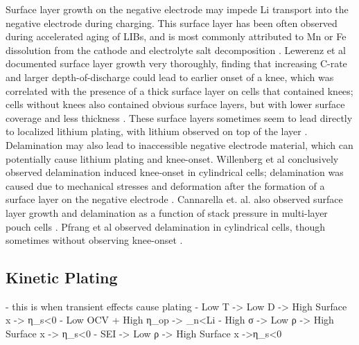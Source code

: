 \documentclass{article}
\begin{document}
Surface layer growth on the negative electrode may impede Li transport into the negative electrode during charging. This surface layer has been often observed during accelerated aging of LIBs, and is most commonly attributed to Mn or Fe dissolution from the cathode and electrolyte salt decomposition \cite{lewerenz_post-mortem_2017,lewerenz_systematic_2017,zhu_investigation_2021,stiaszny_electrochemical_2014,rahe_nanoscale_2019,keil_linear_2019,sarasketa-zabala_understanding_2015, willenberg_high-precision_2020}. Lewerenz et al documented surface layer growth very thoroughly, finding that increasing C-rate and larger depth-of-discharge could lead to earlier onset of a knee, which was correlated with the presence of a thick surface layer on cells that contained knees; cells without knees also contained obvious surface layers, but with lower surface coverage and less thickness \cite{lewerenz_post-mortem_2017,lewerenz_systematic_2017}. These surface layers sometimes seem to lead directly to localized lithium plating, with lithium observed on top of the layer \cite{zhu_investigation_2021}. Delamination may also lead to inaccessible negative electrode material, which can potentially cause lithium plating and knee-onset. Willenberg et al conclusively observed delamination induced knee-onset in cylindrical cells; delamination was caused due to mechanical stresses and deformation after the formation of a surface layer on the negative electrode \cite{willenberg_high-precision_2020}. Cannarella et. al. also observed surface layer growth and delamination as a function of stack pressure in multi-layer pouch cells \cite{cannarella_stress_2014}. Pfrang et al observed delamination in cylindrical cells, though sometimes without observing knee-onset \cite{pfrang_long-term_2018}.

\subsection{Kinetic Plating}
- this is when transient effects cause plating
    - Low T -> Low D -> High Surface x -> η_s<0
    - Low OCV + High η_op -> \eta_n<Li
    - High σ -> Low ρ -> High Surface x -> η_s<0
    - SEI -> Low ρ -> High Surface x ->η_s<0
\end{document}
